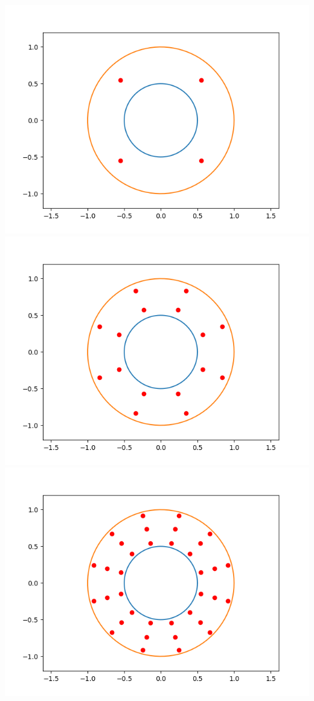 \documentclass[10pt,a4paper]{letter}
\begin{document}
\includegraphics[scale=.5]{annulus_n1}
\includegraphics[scale=.5]{annulus_n2}
\includegraphics[scale=.5]{annulus_n3}
\end{document}
